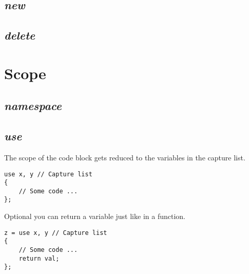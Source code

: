 \documentclass[11pt,a4paper]{article}
\begin{document}
\subsection{\textit{new}}


\subsection{\textit{delete}}




\section{Scope}


\subsection{\textit{namespace}}


\subsection{\textit{use}}
The scope of the code block gets reduced to the variables in the capture list.
\begin{lstlisting}
use x, y // Capture list
{
	// Some code ...
};
\end{lstlisting}
Optional you can return a variable just like in a function.
\begin{lstlisting}
z = use x, y // Capture list
{
	// Some code ...
	return val;
};
\end{lstlisting}
\end{document}
